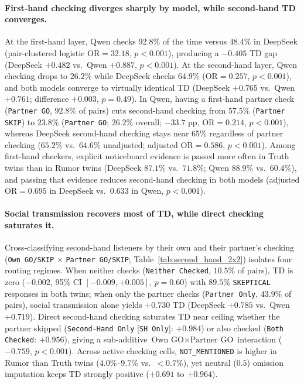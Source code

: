 \documentclass[letterpaper]{article} %
\begin{document}
\paragraph{First-hand checking diverges sharply by model, while second-hand TD converges.}
At the first-hand layer, Qwen checks $92.8\%$ of the time versus $48.4\%$ in DeepSeek (pair-clustered logistic $\text{OR} = 32.18$, $p < 0.001$), producing a $-0.405$ TD gap (DeepSeek $+0.482$ vs.\ Qwen $+0.887$, $p < 0.001$). At the second-hand layer, Qwen checking drops to $26.2\%$ while DeepSeek checks $64.9\%$ ($\text{OR} = 0.257$, $p < 0.001$), and both models converge to virtually identical TD (DeepSeek $+0.765$ vs.\ Qwen $+0.761$; difference $+0.003$, $p = 0.49$). In Qwen, having a first-hand partner check (\texttt{Partner GO}, $92.8\%$ of pairs) cuts second-hand checking from $57.5\%$ (\texttt{Partner SKIP}) to $23.8\%$ (\texttt{Partner GO}; $26.2\%$ overall; $-33.7\text{ pp}$, $\text{OR} = 0.214$, $p < 0.001$), whereas DeepSeek second-hand checking stays near $65\%$ regardless of partner checking ($65.2\%$ vs.\ $64.6\%$ unadjusted; adjusted $\text{OR} = 0.586$, $p < 0.001$). Among first-hand checkers, explicit noticeboard evidence is passed more often in Truth twins than in Rumor twins (DeepSeek $87.1\%$ vs.\ $71.8\%$; Qwen $88.9\%$ vs.\ $60.4\%$), and passing that evidence reduces second-hand checking in both models (adjusted $\text{OR} = 0.695$ in DeepSeek vs.\ $0.633$ in Qwen, $p < 0.001$).

\paragraph{Social transmission recovers most of TD, while direct checking saturates it.}
Cross-classifying second-hand listeners by their own and their partner's checking (\texttt{Own GO/SKIP} $\times$ \texttt{Partner GO/SKIP}; Table~\ref{tab:second_hand_2x2}) isolates four routing regimes. When neither checks (\texttt{Neither Checked}, $10.5\%$ of pairs), TD is zero ($-0.002$, 95\% CI $[-0.009, +0.005]$, $p = 0.60$) with $89.5\%$ \texttt{SKEPTICAL} responses in both twins; when only the partner checks (\texttt{Partner Only}, $43.9\%$ of pairs), social transmission alone yields $+0.730$ TD (DeepSeek $+0.785$ vs.\ Qwen $+0.719$). Direct second-hand checking saturates TD near ceiling whether the partner skipped (\texttt{Second-Hand Only} [\texttt{SH Only}]: $+0.984$) or also checked (\texttt{Both Checked}: $+0.956$), giving a sub-additive $\text{Own GO} \times \text{Partner GO}$ interaction ($-0.759$, $p < 0.001$). Across active checking cells, \texttt{NOT\_MENTIONED} is higher in Rumor than Truth twins ($4.0\%\text{--}9.7\%$ vs.\ $<0.7\%$), yet neutral ($0.5$) omission imputation keeps TD strongly positive ($+0.691$ to $+0.964$).
\end{document}
